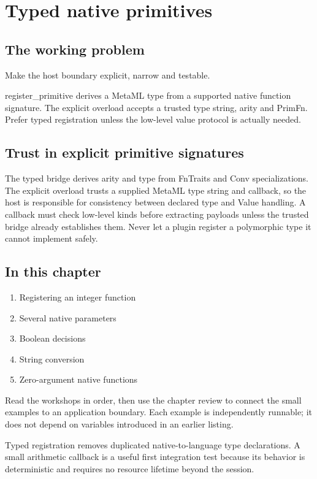 \chapter{Typed native primitives}\label{ch:19}
\section*{The working problem}
Make the host boundary explicit, narrow and testable.

register\_primitive derives a MetaML type from a supported native function signature. The explicit overload accepts a trusted type string, arity and PrimFn. Prefer typed registration unless the low-level value protocol is actually needed.

\section*{Trust in explicit primitive signatures}
The typed bridge derives arity and type from FnTraits and Conv specializations. The explicit overload trusts a supplied MetaML type string and callback, so the host is responsible for consistency between declared type and Value handling. A callback must check low-level kinds before extracting payloads unless the trusted bridge already establishes them. Never let a plugin register a polymorphic type it cannot implement safely.

\section*{In this chapter}
\begin{enumerate}
\item Registering an integer function
\item Several native parameters
\item Boolean decisions
\item String conversion
\item Zero-argument native functions
\end{enumerate}
Read the workshops in order, then use the chapter review to connect the small examples to an application boundary. Each example is independently runnable; it does not depend on variables introduced in an earlier listing.

\clearpage
{}
Typed registration removes duplicated native-to-language type declarations. A small arithmetic callback is a useful first integration test because its behavior is deterministic and requires no resource lifetime beyond the session.

